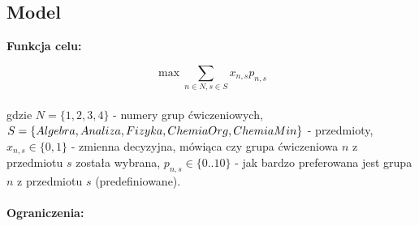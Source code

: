 \documentclass[12pt, a4paper]{article}
\begin{document}
\subsection{Model}

\textbf{Funkcja celu:}


\[\max \sum_{n \in N, s \in S} x_{n,s}p_{n,s}\]
\\
gdzie $N=\{1,2,3,4\}$ - numery grup ćwiczeniowych, $S=\{Algebra, Analiza, \\Fizyka, ChemiaOrg, ChemiaMin\}$ - przedmioty,
$x_{n,s} \in \{0, 1\}$ - zmienna decyzyjna, mówiąca czy grupa ćwiczeniowa $n$ z przedmiotu $s$ została wybrana, $p_{n,s} \in \{0..10\}$ - jak bardzo preferowana jest grupa $n$ z przedmiotu $s$ (predefiniowane).
\\
\\
\textbf{Ograniczenia:}
\end{document}

